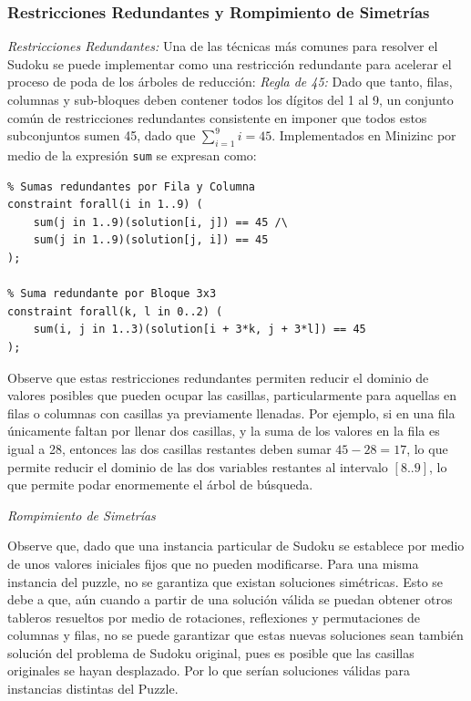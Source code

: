 \subsubsection{Restricciones Redundantes y Rompimiento de Simetrías}
\textit{Restricciones Redundantes:}
Una de las técnicas más comunes para resolver el Sudoku se puede implementar como una restricción redundante para acelerar el proceso de poda de los árboles de reducción:
\textit{Regla de 45:} Dado que tanto, filas, columnas y sub-bloques deben contener todos los dígitos del 1 al 9, un conjunto común de restricciones redundantes consistente en imponer que todos estos subconjuntos sumen 45, dado que $\sum_{i=1}^{9}i=45$. Implementados en Minizinc por medio de la expresión \verb|sum| se expresan como:
    \begin{verbatim}
% Sumas redundantes por Fila y Columna
constraint forall(i in 1..9) (
    sum(j in 1..9)(solution[i, j]) == 45 /\
    sum(j in 1..9)(solution[j, i]) == 45
);

% Suma redundante por Bloque 3x3
constraint forall(k, l in 0..2) (
    sum(i, j in 1..3)(solution[i + 3*k, j + 3*l]) == 45
);
    \end{verbatim}

Observe que estas restricciones redundantes permiten reducir el dominio de valores posibles que pueden ocupar las casillas, particularmente para aquellas en filas o columnas con casillas ya previamente llenadas. Por ejemplo, si en una fila únicamente faltan por llenar dos casillas, y la suma de los valores en la fila es igual a 28, entonces las dos casillas restantes deben sumar $45-28=17$, lo que permite reducir el dominio de las dos variables restantes al intervalo $[8..9]$, lo que permite podar enormemente el árbol de búsqueda.

\textit{Rompimiento de Simetrías}

Observe que, dado que una instancia particular de Sudoku se establece por medio de unos valores iniciales fijos que no pueden modificarse. Para una misma instancia del puzzle, no se garantiza que existan soluciones simétricas. Esto se debe a que, aún cuando a partir de una solución válida se puedan obtener otros tableros resueltos por medio de rotaciones, reflexiones y permutaciones de columnas y filas, no se puede garantizar que estas nuevas soluciones sean también solución del problema de Sudoku original, pues es posible que las casillas originales se hayan desplazado.
Por lo que serían soluciones válidas para instancias distintas del Puzzle.\\

